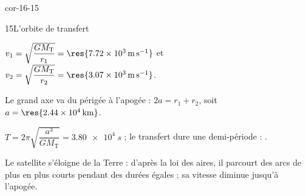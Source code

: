 \begin{blocLivre}{cor-16-15}
\begin{corrige}{15}{L'orbite de transfert}
\begin{questions}
\item $v_1=\sqrt{\dfrac{GM_\mathrm{T}}{r_1}}=\res{\qty{7,72e3}{m.s^{-1}}}$ et $v_2=\sqrt{\dfrac{GM_\mathrm{T}}{r_2}}=\res{\qty{3,07e3}{m.s^{-1}}}$.
\item Le grand axe va du périgée à l'apogée : $2a=r_1+r_2$, soit $a=\res{\qty{2,44e4}{km}}$.
\item $T=2\pi\sqrt{\dfrac{a^3}{GM_\mathrm{T}}}=\qty{3,80e4}{s}$ ; le transfert dure une demi-période : .
\item Le satellite s'éloigne de la Terre : d'après la loi des aires, il parcourt des arcs de plus en plus courts pendant
des durées égales ; sa vitesse diminue jusqu'à l'apogée.
\end{questions}
\end{corrige}
\end{blocLivre}
